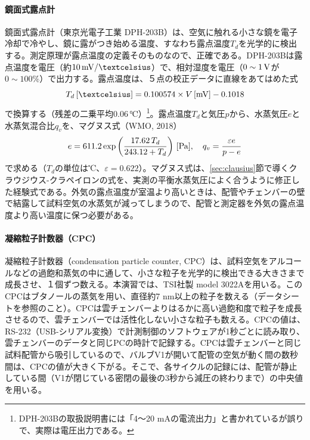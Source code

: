 \documentclass{ltjsarticle}
\begin{document}
\paragraph{鏡面式露点計}
鏡面式露点計（東京光電子工業 DPH-203B）は、空気に触れる小さな鏡を電子冷却で冷やし、鏡に露がつき始める温度、すなわち露点温度$T_{d}$を光学的に検出する。測定原理が露点温度の定義そのものなので、正確である。DPH-203Bは露点温度を電圧（約$10\,\rm mV/℃$）で、相対湿度を電圧（$0\sim1\,\rm V$が$0\sim100\%$）で出力する。露点温度は、５点の校正データに直線をあてはめた式
\begin{equation}\label{eq:td_calib}
T_{d}\,[℃]=0.100574\times V\,[{\rm mV}]-0.1018
\end{equation}
で換算する（残差の二乗平均$0.06\,℃$）\footnote{DPH-203Bの取扱説明書には「4〜20 mAの電流出力」と書かれているが誤りで、実際は電圧出力である。}。露点温度$T_{d}$と気圧$p$から、水蒸気圧$e$と水蒸気混合比$q_{v}$を、マグヌス式（WMO, 2018）
\begin{equation}\label{eq:magnus}
e=611.2\exp{\bigg (}\frac{17.62\,T_{d}}{243.12+T_{d}}{\bigg )}\ [{\rm Pa}],\ \ \ q_{v}=\frac{\varepsilon e}{p-e}
\end{equation}
で求める（$T_{d}$の単位は℃、$\varepsilon=0.622$）。マグヌス式は、\ref{sec:clausius}節で導くクラウジウス-クラペイロンの式を、実測の平衡水蒸気圧によく合うように修正した経験式である。外気の露点温度が室温より高いときは、配管やチェンバーの壁で結露して試料空気の水蒸気が減ってしまうので、配管と測定器を外気の露点温度より高い温度に保つ必要がある。
\paragraph{凝縮粒子計数器（CPC）}
凝縮粒子計数器（condensation particle counter, CPC）は、試料空気をアルコールなどの過飽和蒸気の中に通して、小さな粒子を光学的に検出できる大きさまで成長させ、１個ずつ数える。本演習では、TSI社製 model 3022Aを用いる。このCPCはブタノールの蒸気を用い、直径約7 nm以上の粒子を数える（データシートを参照のこと）。CPCは雲チェンバーよりはるかに高い過飽和度で粒子を成長させるので、雲チェンバーでは活性化しない小さな粒子も数える。CPCの値は、RS-232（USB-シリアル変換）で計測制御のソフトウェアが1秒ごとに読み取り、雲チェンバーのデータと同じPCの時計で記録する。CPCは雲チェンバーと同じ試料配管から吸引しているので、バルブV1が開いて配管の空気が動く間の数秒間は、CPCの値が大きく下がる。そこで、各サイクルの記録には、配管が静止している間（V1が閉じている密閉の最後の3秒から減圧の終わりまで）の中央値を用いる。
\\
\end{document}
